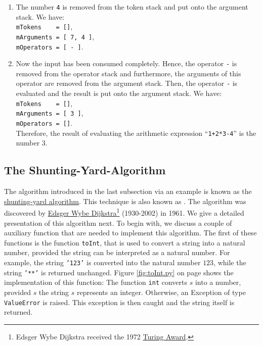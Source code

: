\begin{enumerate}
\item The number \texttt{4} is removed from the token stack and put onto the argument stack. We have: \\[0.2cm]
      \hspace*{1.3cm} \texttt{mTokens \ \ \ = []}, \\[0.2cm]
      \hspace*{1.3cm} \texttt{mArguments = [ 7, 4 ]}, \\[0.2cm]
      \hspace*{1.3cm} \texttt{mOperators = [ - ]}. 
\item Now the input has been consumed completely.
      Hence, the operator \texttt{-} is removed from the  operator stack and
      furthermore, the arguments of this operator are removed from the argument stack.  Then, the
      operator \texttt{-} is evaluated and the result is put onto the argument
      stack.  We have: \\[0.2cm]
      \hspace*{1.3cm} \texttt{mTokens \ \ \ = []}, \\[0.2cm]
      \hspace*{1.3cm} \texttt{mArguments = [ 3 ]}, \\[0.2cm]
      \hspace*{1.3cm} \texttt{mOperators = []}. \\[0.2cm]
      Therefore, the result of evaluating the arithmetic expression ``\texttt{1+2*3-4}'' is the
      number 3.
\end{enumerate}

\subsection{The Shunting-Yard-Algorithm \label{algo-arith}}
The algorithm introduced in the last subsection via an example is known as the 
\href{http://en.wikipedia.org/wiki/Shunting-yard_algorithm}{shunting-yard algorithm}.  
This technique is also known as .
The algorithm was discovered by  \href{http://en.wikipedia.org/wiki/Edsger_Dijkstra}{Edsger Wybe Dijkstra}\footnote{
  Edsger Wybe Dijkstra received the 1972 \href{https://en.wikipedia.org/wiki/Turing_Award}{Turing Award}.
}
(1930-2002) in 1961. 
We give a detailed presentation of this algorithm next.  To begin with, we discuss a couple of auxiliary
function that are needed to implement this algorithm.  The first of these functions is the function
\texttt{toInt}, that is used to convert a string into a natural number, provided the string can be interpreted as a
natural number.  For example, the string \texttt{'123'} is converted into the natural number $123$, while the
string \texttt{'**'} is returned unchanged.  Figure \ref{fig:toInt.py} on page \pageref{fig:toInt.py} shows the
implementation of this function:  The function \texttt{int} converts $s$ into a number, provided $s$ the string
$s$ represents an integer.  Otherwise, an Exception of type \texttt{ValueError} is raised.  This exception is
then caught and the string itself is returned.



